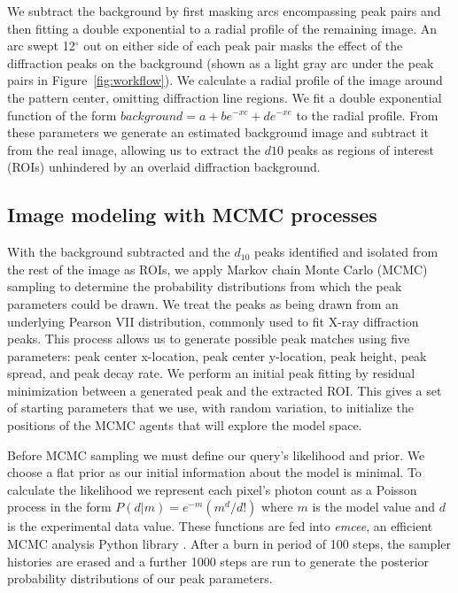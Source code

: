 \documentclass{llncs}
\begin{document}
We subtract the background by first masking arcs encompassing peak
pairs and then fitting a double exponential to a radial profile of the
remaining image. An arc swept 12$^\circ$ out on either side of each
peak pair masks the effect of the diffraction peaks on the background
(shown as a light gray arc under the peak pairs in
Figure~\ref{fig:workflow}). We calculate a radial profile of the image
around the pattern center, omitting diffraction line regions. We fit a
double exponential function of the form $background = a+ b e^{-x c} +
d e^{-x e}$ to the radial profile. From these parameters we generate
an estimated background image and subtract it from the real image,
allowing us to extract the $d{10}$ peaks as regions of interest (ROIs)
unhindered by an overlaid diffraction background.

\subsection{Image modeling with MCMC processes}

With the background subtracted and the $d_{10}$ peaks identified and
isolated from the rest of the image as ROIs, we apply Markov chain
Monte Carlo (MCMC) sampling to determine the probability distributions
from which the peak parameters could be drawn. We treat the peaks as
being drawn from an underlying Pearson VII distribution, commonly used
to fit X-ray diffraction peaks. This process allows us to generate
possible peak matches using five parameters: peak center x-location,
peak center y-location, peak height, peak spread, and peak decay rate.
We perform an initial peak fitting by residual minimization between a
generated peak and the extracted ROI. This gives a set of starting
parameters that we use, with random variation, to initialize the
positions of the MCMC agents that will explore the model space. 

Before MCMC sampling we must define our query's likelihood and prior.
We choose a flat prior as our initial information about the model is
minimal. To calculate the likelihood we represent each pixel's photon
count as a Poisson process in the form $P(d|m)=e^{-m}
\left(m^{d}/d!\right)$ where $m$ is the model value and $d$ is the
experimental data value. These functions are fed into \textit{emcee},
an efficient MCMC analysis Python library \cite{ForemanMackey2013}.
After a burn in period of 100 steps, the sampler histories are erased
and a further 1000 steps are run to generate the posterior probability
distributions of our peak parameters. 
\end{document}
